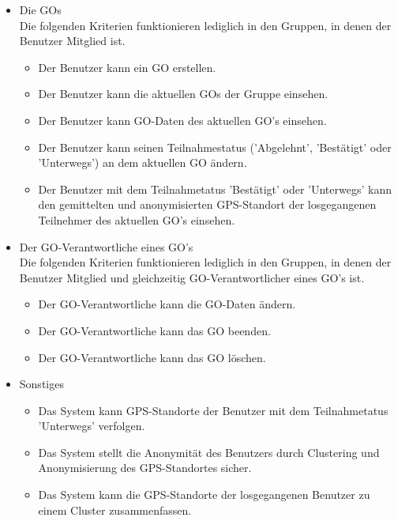 \documentclass[parskip=full]{scrartcl}
\begin{document}
\begin{itemize}[itemsep=0pt]
	\item Die \glspl{GO}\\
	Die folgenden Kriterien funktionieren lediglich in den Gruppen, in denen der Benutzer Mitglied ist.
	\begin{itemize}
		\item Der Benutzer kann ein GO erstellen.
		\item Der Benutzer kann die aktuellen GOs der Gruppe einsehen.
		\item Der Benutzer kann GO-Daten des aktuellen GO's einsehen.
		\item Der Benutzer kann seinen Teilnahmestatus  ('Abgelehnt', 'Bestätigt' oder 'Unterwegs') an dem aktuellen GO ändern.
		\item Der Benutzer mit dem Teilnahmetatus 'Bestätigt' oder 'Unterwegs' kann den gemittelten und anonymisierten GPS-Standort der losgegangenen Teilnehmer des aktuellen GO's einsehen.
	\end{itemize}
	
	\item Der GO-Verantwortliche eines GO's\\
	Die folgenden Kriterien funktionieren lediglich in den Gruppen, in denen der Benutzer Mitglied und gleichzeitig GO-Verantwortlicher eines GO's ist.
	\begin{itemize}
		\item Der GO-Verantwortliche kann die GO-Daten ändern.
		\item Der GO-Verantwortliche kann das GO beenden.
		\item Der GO-Verantwortliche kann das GO löschen.
	\end{itemize}
	
	\item Sonstiges
	\begin{itemize}
		\item Das System kann GPS-Standorte der Benutzer mit dem Teilnahmetatus 'Unterwegs' verfolgen.
		\item Das System stellt die Anonymität des Benutzers durch \gls{Clustering} und Anonymisierung des GPS-Standortes sicher. %
		\item Das System kann die GPS-Standorte der losgegangenen Benutzer zu einem Cluster zusammenfassen.
	\end{itemize}
\end{itemize}

\newpage
	
\end{document}
